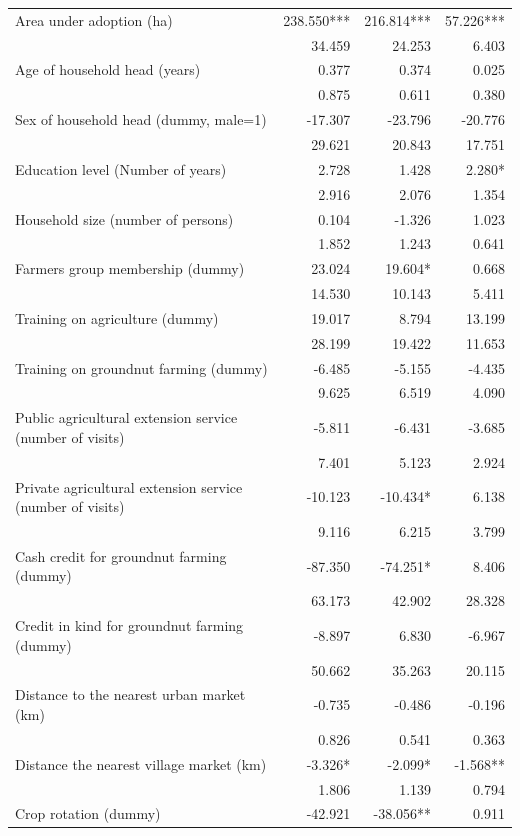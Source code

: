 \documentclass[
]{article}
\begin{document}
\begin{longtable}[t]{lrrr}
\endfoot
\bottomrule
\endlastfoot
Area under adoption (ha) & 238.550*** & 216.814*** & 57.226***\\
 & 34.459 & 24.253 & 6.403\\
Age of household head (years) & 0.377 & 0.374 & 0.025\\
 & 0.875 & 0.611 & 0.380\\
Sex of household head (dummy, male=1) & -17.307 & -23.796 & -20.776\\
 & 29.621 & 20.843 & 17.751\\
Education level (Number of years) & 2.728 & 1.428 & 2.280*\\
 & 2.916 & 2.076 & 1.354\\
Household size (number of persons) & 0.104 & -1.326 & 1.023\\
 & 1.852 & 1.243 & 0.641\\
Farmers group membership (dummy) & 23.024 & 19.604* & 0.668\\
 & 14.530 & 10.143 & 5.411\\
Training on agriculture (dummy) & 19.017 & 8.794 & 13.199\\
 & 28.199 & 19.422 & 11.653\\
Training on groundnut farming (dummy) & -6.485 & -5.155 & -4.435\\
 & 9.625 & 6.519 & 4.090\\
Public agricultural extension service (number of visits) & -5.811 & -6.431 & -3.685\\
 & 7.401 & 5.123 & 2.924\\
Private agricultural extension service (number of visits) & -10.123 & -10.434* & 6.138\\
 & 9.116 & 6.215 & 3.799\\
Cash credit for groundnut farming (dummy) & -87.350 & -74.251* & 8.406\\
 & 63.173 & 42.902 & 28.328\\
Credit in kind for groundnut farming (dummy) & -8.897 & 6.830 & -6.967\\
 & 50.662 & 35.263 & 20.115\\
Distance to the nearest urban market (km) & -0.735 & -0.486 & -0.196\\
 & 0.826 & 0.541 & 0.363\\
Distance the nearest village market (km) & -3.326* & -2.099* & -1.568**\\
 & 1.806 & 1.139 & 0.794\\
Crop rotation (dummy) & -42.921 & -38.056** & 0.911\\

\end{longtable}
\end{document}
